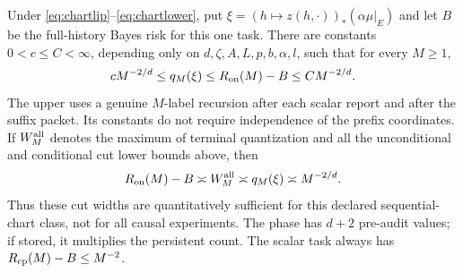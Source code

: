 \begin{theorem}\label{thm:chart}
Under \eqref{eq:chartlip}--\eqref{eq:chartlower}, put
$\xi=(h\mapsto z(h,\cdot))_*(\alpha\mu|_E)$ and let $B$ be the full-history Bayes risk for this one task. There are constants $0<c\le C<\infty$, depending only on $d,\zeta,A,L,p,b,\alpha,l$, such that for every $M\ge1$,
\begin{equation}\label{eq:chartlaw}
 cM^{-2/d}\le q_M(\xi)\le R_{\mathrm{on}}(M)-B\le CM^{-2/d}.
\end{equation}
The upper uses a genuine $M$-label recursion after each scalar report and after the suffix packet. Its constants do not require independence of the prefix coordinates. If $W_M^{\rm all}$ denotes the maximum of terminal quantization and all the unconditional and conditional cut lower bounds above, then
\begin{equation}\label{eq:chartcomplete}
 R_{\mathrm{on}}(M)-B\asymp W_M^{\rm all}\asymp q_M(\xi)\asymp M^{-2/d}.
\end{equation}
Thus these cut widths are quantitatively sufficient for this declared sequential-chart class, not for all causal experiments. The phase has $d+2$ pre-audit values; if stored, it multiplies the persistent count. The scalar task always has $R_{\mathrm{cp}}(M)-B\le M^{-2}$.
\end{theorem}
